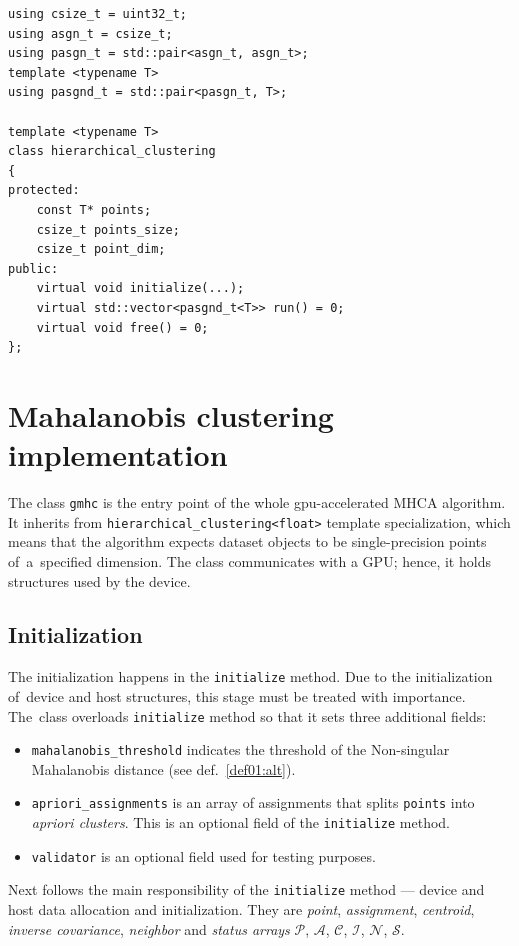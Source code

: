 \begin{lstlisting}[caption={A summary of \texttt{hierarchical\_clustering} header file.},label={lst03:hc}]
using csize_t = uint32_t;
using asgn_t = csize_t;
using pasgn_t = std::pair<asgn_t, asgn_t>;
template <typename T>
using pasgnd_t = std::pair<pasgn_t, T>;

template <typename T>
class hierarchical_clustering
{
protected:
	const T* points;
	csize_t points_size;
	csize_t point_dim;
public:
	virtual void initialize(...);
	virtual std::vector<pasgnd_t<T>> run() = 0;
	virtual void free() = 0;
};
\end{lstlisting}

\section{Mahalanobis clustering implementation}

The class \texttt{gmhc} is the entry point of the whole gpu-accelerated MHCA algorithm. It inherits from \texttt{hierarchical\_clustering<float>} template specialization, which means that the algorithm expects dataset objects to be single-precision points of~a~specified dimension. The class communicates
with a GPU; hence, it holds structures used by the device.

\subsection{Initialization}

The initialization happens in the \texttt{initialize} method. Due to the initialization of~device and host structures, this stage must be treated with importance.
The~class overloads \texttt{initialize} method so that it sets three additional fields:
\begin{itemize}
	\item \texttt{mahalanobis\_threshold} indicates the threshold of the Non-singular Mahalanobis distance (see def.~\ref{def01:alt}).
	
	\item\texttt{apriori\_assignments}  is an array of assignments that splits \texttt{points} into \emph{apriori clusters}. This is an optional field of the \texttt{initialize} method.
	
	\item \texttt{validator} is an optional field used for testing purposes.
\end{itemize}

Next follows the main responsibility of the \texttt{initialize} method --- device and host data allocation and initialization. They are \emph{point}, \emph{assignment}, \emph{centroid}, \emph{inverse covariance}, \emph{neighbor} and \emph{status arrays} $\mathcal{P}$, $\mathcal{A}$, $\mathcal{C}$, $\mathcal{I}$, $\mathcal{N}$, $\mathcal{S}$. 

